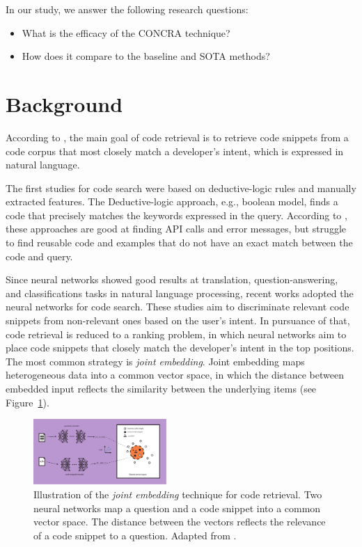 \documentclass[sigconf]{acmart}
\begin{document}
In our study, we answer the following research questions:

\begin{itemize}
    \item What is the efficacy of the CONCRA technique? 
    \item How does it compare to the baseline and SOTA methods?
\end{itemize}


\section{Background}

According to \citet{cambronero-deep-code-search-2019}, the main goal of code retrieval is to retrieve code snippets from a code corpus that most closely match a developer's intent, which is expressed in natural language.

The first studies for code search were based on deductive-logic rules and manually extracted features. The Deductive-logic approach, e.g., boolean model, finds a code that precisely matches the keywords expressed in the query. According to \citet{yan-benchmark-code-search-information-retrieval-deep-learning:2020}, these approaches are good at finding API calls and error messages, but struggle to find reusable code and examples that do not have an exact match between the code and query. 

Since neural networks showed good results at translation, question-answering, and classifications tasks in natural language processing, recent works adopted the neural networks for code search. These studies aim to discriminate relevant code snippets from non-relevant ones based on the user's intent. In pursuance of that, code retrieval is reduced to a ranking problem, in which neural networks aim to place code snippets that closely match the developer's intent in the top positions. The most common strategy is \emph{joint embedding}. Joint embedding maps heterogeneous data into a common vector space, in which the distance between embedded input reflects the similarity between the underlying items \cite{li-joint-embedding-images-2015} (see Figure~\ref{fig:joint-embedding}).

\begin{figure}[h]
  \includegraphics[width=0.45\textwidth]{figuras/joint_embedding-article.pdf}
  \caption{Illustration of the \emph{joint embedding} technique for code retrieval. Two neural networks map a question and a code snippet into a common vector space. The distance between the vectors reflects the relevance of a code snippet to a question. Adapted from \cite{cambronero-deep-code-search-2019}.}
  \label{fig:joint-embedding}
\end{figure}
\end{document}
